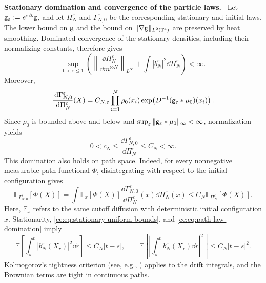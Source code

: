 \documentclass[11pt,reqno]{amsart}
\numberwithin{equation}{section}
\theoremstyle{plain}
\theoremstyle{remark}
\newcommand{\T}{\mathbb T}\newcommand{\R}{\mathbb R}\newcommand{\Z}{\mathbb Z}
\newcommand{\E}{\mathbb E}\newcommand{\Q}{\mathbb Q}\newcommand{\Pb}{\mathbb P}
\newcommand{\parheading}[1]{\par\medskip\noindent\textbf{#1}\ }
\begin{document}
\parheading{Stationary domination and convergence of the particle laws.}
Let $\mathsf g_\varepsilon:=e^{\varepsilon\Delta}\mathsf g$, and let $\Pi_N^\varepsilon$ and $\Gamma_{N,0}^\varepsilon$ be the corresponding stationary and initial laws. The lower bound on $\mathsf g$ and the bound on $\|\nabla\g\|_{L^2(\T^4)}$ are preserved by heat smoothing. Dominated convergence of the stationary densities, including their normalizing constants, therefore gives
\begin{equation}\label{ce:eq:stationary-uniform-bounds}
 \sup_{0<\varepsilon\le1}\left(
 \left\|\frac{\dd\Pi_N^\varepsilon}{\dd m^{\otimes N}}\right\|_{L^\infty}
 +\int|b_N^\varepsilon|^2\dd\Pi_N^\varepsilon\right)<\infty.
\end{equation}
Moreover,
\begin{equation}\label{ce:eq:preparedstationaryratio}
 \frac{\,\mathrm d\Gamma_{N,0}^\varepsilon}{\,\mathrm d\Pi_N^\varepsilon}(X)
 =C_{N,\varepsilon}\prod_{i=1}^N
 \rho_0(x_i)\exp\!\left(D^{-1}(\mathsf g_\varepsilon*\mu_0)(x_i)\right).
\end{equation}
Since $\rho_0$ is bounded above and below and $\sup_\varepsilon\|\mathsf g_\varepsilon*\mu_0\|_\infty<\infty$, normalization yields
\begin{equation}\label{ce:eq:initial-stationary-domination}
 0<c_N\le\frac{\dd\Gamma_{N,0}^\varepsilon}{\dd\Pi_N^\varepsilon}\le C_N<\infty.
\end{equation}
This domination also holds on path space. Indeed, for every nonnegative measurable path functional $\Phi$, disintegrating with respect to the initial configuration gives
\begin{equation}\label{ce:eq:path-law-domination}
 \E_{\Gamma_{N,0}^\varepsilon}[\Phi(X)]
 =\int \E_x[\Phi(X)]\frac{\dd\Gamma_{N,0}^\varepsilon}{\dd\Pi_N^\varepsilon}(x)\dd\Pi_N^\varepsilon(x)
 \le C_N\E_{\Pi_N^\varepsilon}[\Phi(X)].
\end{equation}
Here, $\E_x$ refers to the same cutoff diffusion with deterministic initial configuration $x$.
Stationarity, \eqref{ce:eq:stationary-uniform-bounds}, and \eqref{ce:eq:path-law-domination} imply
\begin{equation}\label{ce:eq:driftmodulus}
 \E\!\left[\int_s^t|b_N^\varepsilon(X_r)|^2\dd r\right]\le C_N|t-s|,
 \qquad
 \E\!\left[\left|\int_s^t b_N^\varepsilon(X_r)\dd r\right|^2\right]\le C_N|t-s|^2.
\end{equation}
Kolmogorov's tightness criterion (see, e.g., \cite[Chapter~I, Theorem~2.1]{RevuzYor}) applies to the drift integrals, and the Brownian terms are tight in continuous paths.
\end{document}
